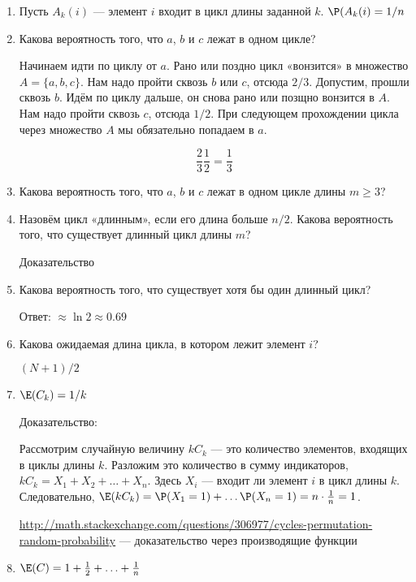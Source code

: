 \documentclass[10pt]{article}
\begin{document}
\begin{enumerate}

\item Пусть $A_k(i)$ --- элемент $i$ входит в цикл длины заданной $k$. $\P(A_k(i)=1/n$





\item Какова вероятность того, что $a$, $b$ и $c$ лежат в одном цикле?

Начинаем идти по циклу от $a$. Рано или поздно цикл «вонзится» в множество $A=\{a, b, c\}$. Нам надо пройти сквозь $b$ или $c$, отсюда $2/3$. Допустим, прошли сквозь $b$. Идём по циклу дальше, он снова рано или позщно вонзится в $A$. Нам надо пройти сквозь $c$, отсюда $1/2$. При следующем прохождении цикла через множество $A$ мы обязательно попадаем в $a$.

\[
\frac{2}{3}\frac{1}{2} = \frac{1}{3}
\]

\item Какова вероятность того, что $a$, $b$ и $c$ лежат в одном цикле длины $m \geq 3$?



\item Назовём цикл «длинным», если его длина больше $n/2$. Какова вероятность того, что существует длинный цикл длины $m$?

Доказательство 


\item Какова вероятность того, что существует хотя бы один длинный цикл?

Ответ: $ \approx \ln 2 \approx 0.69$


\item Какова ожидаемая длина цикла, в котором лежит элемент $i$?

$(N+1)/2$


\item $\E(C_k)=1/k$

Доказательство:

Рассмотрим случайную величину $kC_k$ --- это количество элементов, входящих в циклы длины $k$. Разложим это количество в сумму индикаторов, $kC_k=X_1+X_2+ \ldots + X_n$. Здесь $X_i$ --- входит ли элемент $i$ в цикл длины $k$. Следовательно, $\E(kC_k)=\P(X_1=1) + \ldots \P(X_n=1)=n\cdot \frac{1}{n}=1$.


\url{http://math.stackexchange.com/questions/306977/cycles-permutation-random-probability} --- доказательство через производящие функции

\item $\E(C)=1+\frac{1}{2}+\ldots + \frac{1}{n}$


\end{enumerate}
\end{document}
